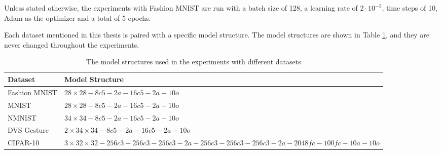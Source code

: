     Unless stated otherwise, the experiments with Fashion MNIST are run with a batch size of 128, a learning rate of $2\cdot10^{-3}$, time steps of 10, Adam as the optimizer and a total of 5 epochs. 

    Each dataset mentioned in this thesis is paired with a specific model structure. The model structures are shown in Table \ref{tab:datasets_models}, and they are never changed throughout the experiments.
    \begin{table}[!htpb]
        \begin{tabularx}{\textwidth}{|l|X|}
            \toprule
            Dataset & Model Structure \\
            \midrule
            Fashion MNIST & $28\times 28 - 8c5 - 2a - 16c5 - 2a - 10o$ \\
            MNIST & $28\times 28 - 8c5 - 2a - 16c5 - 2a - 10o$ \\
            NMNIST & $34\times 34 - 8c5 - 2a - 16c5 - 2a - 10o$ \\
            DVS Gesture & $2\times 34\times 34 - 8c5 - 2a - 16c5 - 2a - 10o$ \\
            CIFAR-10 & $3\times 32\times 32 - 256c3 - 256c3 - 256c3 - 2a - 256c3 - 256c3 - 256c3 - 2a - 2048fc - 100fc - 10a - 10o$ \\
            \bottomrule
        \end{tabularx}
        \caption{The model structures used in the experiments with different datasets}
        \label{tab:datasets_models}
    \end{table}

